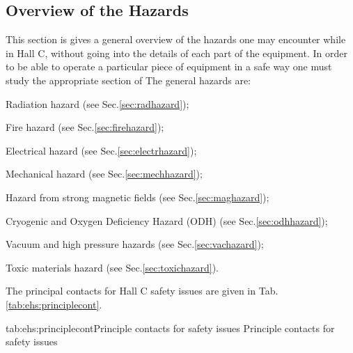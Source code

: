  
\begin{safetyen}{0}{0}
\section{Overview of the Hazards} 
\end{safetyen}
\label{sec:overviewhazards}

This section is gives a general overview of the hazards one may encounter
while in Hall C,
without going into the details of each part of the equipment.  In order to 
be able to operate a particular piece of equipment in a safe way one must study the appropriate
section of  
The general hazards are:
\begin{list}{.~}{\setlength{\itemsep}{-0.15cm}}
  \item Radiation hazard (see Sec.\ref{sec:radhazard});
  \item Fire hazard (see Sec.\ref{sec:firehazard});
  \item Electrical hazard (see Sec.\ref{sec:electrhazard});
  \item Mechanical hazard (see Sec.\ref{sec:mechhazard});
  \item Hazard from strong magnetic fields (see Sec.\ref{sec:maghazard});
  \item Cryogenic and Oxygen Deficiency Hazard (ODH) (see Sec.\ref{sec:odhhazard});
  \item Vacuum and high pressure hazards  (see Sec.\ref{sec:vachazard});
  \item Toxic materials hazard  (see Sec.\ref{sec:toxichazard}).
\end{list}

The principal contacts for Hall C safety issues are given in Tab.\ref{tab:ehs:principlecont}.
 
\begin{namestab}{tab:ehs:principlecont}{Principle contacts for safety issues}{%
   Principle contacts for safety issues}
\end{namestab}
 
